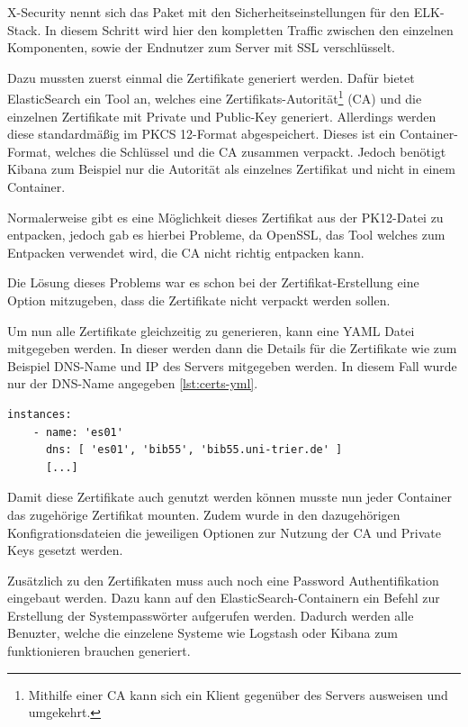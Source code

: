 X-Security nennt sich das Paket mit den Sicherheitseinstellungen für den ELK-Stack. In diesem Schritt wird hier den kompletten Traffic zwischen den einzelnen Komponenten, sowie der Endnutzer zum Server mit SSL verschlüsselt. 

Dazu mussten zuerst einmal die Zertifikate generiert werden. Dafür bietet ElasticSearch ein Tool an, welches eine Zertifikats-Autorität\footnote{Mithilfe einer CA kann sich ein Klient gegenüber des Servers ausweisen und umgekehrt.} (CA) und die einzelnen Zertifikate mit Private und Public-Key generiert. Allerdings werden diese standardmäßig im PKCS 12-Format abgespeichert. Dieses ist ein Container-Format, welches die Schlüssel und die CA zusammen verpackt. Jedoch benötigt Kibana zum Beispiel nur die Autorität als einzelnes Zertifikat und nicht in einem Container.

Normalerweise gibt es eine Möglichkeit dieses Zertifikat aus der PK12-Datei zu entpacken, jedoch gab es hierbei Probleme, da OpenSSL, das Tool welches zum Entpacken verwendet wird, die CA nicht richtig entpacken kann. \cite{nerophon.2018}

Die Lösung dieses Problems war es schon bei der Zertifikat-Erstellung eine Option mitzugeben, dass die Zertifikate nicht verpackt werden sollen. 

Um nun alle Zertifikate gleichzeitig zu generieren, kann eine YAML Datei mitgegeben werden. In dieser werden dann die Details für die Zertifikate wie zum Beispiel DNS-Name und IP des Servers mitgegeben werden. In diesem Fall wurde nur der DNS-Name angegeben \ref{lst:certs-yml}.

\begin{lstlisting}[language=XML, frame=single, label={lst:certs-yml}] 
	instances:
	- name: 'es01'
	  dns: [ 'es01', 'bib55', 'bib55.uni-trier.de' ]
	  [...]
\end{lstlisting}

Damit diese Zertifikate auch genutzt werden können musste nun jeder Container das zugehörige Zertifikat mounten. Zudem wurde in den dazugehörigen Konfigrationsdateien die jeweiligen Optionen zur Nutzung der CA und Private Keys gesetzt werden.

Zusätzlich zu den Zertifikaten muss auch noch eine Password Authentifikation eingebaut werden. Dazu kann auf den ElasticSearch-Containern ein Befehl zur Erstellung der Systempasswörter aufgerufen werden. Dadurch werden alle Benuzter, welche die einzelene Systeme wie Logstash oder Kibana zum funktionieren brauchen generiert.

